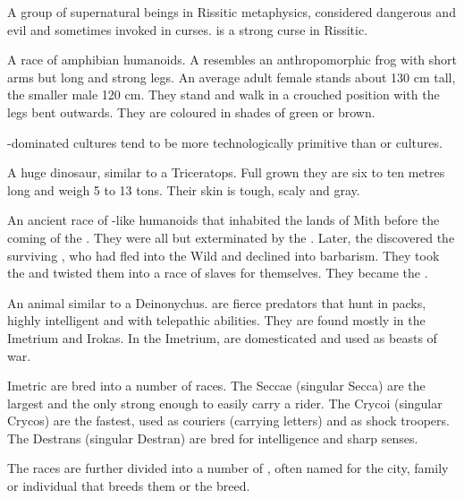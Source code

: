 \gitempl{\Maskim}{\Maskim}
A group of supernatural beings in Rissitic metaphysics, considered dangerous and evil and sometimes invoked in curses.  is a strong curse in Rissitic.



\gitemplor{\meccaran}{\meccarans}{\meccara}
A race of amphibian humanoids. A \meccaran{} resembles an anthropomorphic frog with short arms but long and strong legs. An average adult female stands about 130 cm tall, the smaller male 120 cm. They stand and walk in a crouched position with the legs bent outwards. They are coloured in shades of green or brown. 

\Meccaran-dominated cultures tend to be more technologically primitive than \scathaese{} or \human{} cultures. 



A huge dinosaur, similar to a Triceratops. Full grown they are six to ten metres long and weigh 5 to 13 tons. Their skin is tough, scaly and gray. 



\gitempl{\nephil}{\nephilim}
An ancient race of \human{}-like humanoids that inhabited the lands of Mith before the coming of the \dragons{}. They were all but exterminated by the \Dominators. Later, the \banes{} discovered the surviving \nephilim, who had fled into the Wild and declined into barbarism. They took the \nephilim{} and twisted them into a race of slaves for themselves. They became the \humans{}. 



\gitem{\nycan{}}
An animal similar to a Deinonychus. \Nycans{} are fierce predators that hunt in packs, highly intelligent and with telepathic abilities. They are found mostly in the Imetrium and Irokas. In the Imetrium, \nycans{} are domesticated and used as beasts of war. 

Imetric \nycans{} are bred into a number of races. The Seccae (singular Secca) are the largest and the only \nycans{} strong enough to easily carry a rider. The Crycoi (singular Crycos) are the fastest, used as couriers (carrying letters) and as shock troopers. The Destrans (singular Destran) are bred for intelligence and sharp senses. 

The races are further divided into a number of , often named for the city, family or individual that breeds them or  the breed. 

